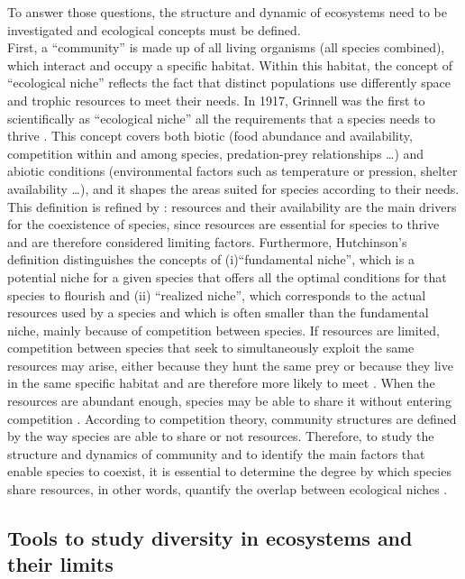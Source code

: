 To answer those questions, the structure and dynamic of ecosystems need to be investigated and ecological concepts must be defined. \\ First, a ``community'' is made up of all living organisms (all species combined), which interact and occupy a specific habitat. Within this habitat, the concept of ``ecological niche'' reflects the fact that distinct populations use differently space and trophic resources to meet their needs. In 1917, Grinnell was the first to scientifically as ``ecological niche'' all the requirements that a species needs to thrive \citep{grinnell1917}.
This concept covers both biotic (food abundance and availability, competition within and among species, predation-prey relationships \ldots{}) and abiotic conditions (environmental factors such as temperature or pression, shelter availability \ldots{}), and it shapes the areas suited for species according to their needs. This definition is refined by \citet{hutchinson1957}: resources and their availability are the main drivers for the coexistence of species, since resources are essential for species to thrive and are therefore considered limiting factors. Furthermore, Hutchinson’s definition distinguishes the concepts of (i)``fundamental niche'', which is a potential niche for a given species that offers all the optimal conditions for that species to flourish and (ii) ``realized niche'', which corresponds to the actual resources used by a species and which is often smaller than the fundamental niche, mainly because of competition between species. If resources are limited, competition between species that seek to simultaneously exploit the same resources may arise, either because they hunt the same prey or because they live in the same specific habitat and are therefore more likely to meet \citep{blondel1979}. When the resources are abundant enough, species may be able to share it without entering competition \citep{nagelkerke2018}. According to competition theory, community structures are defined by the way species are able to share or not resources. Therefore, to study the structure and dynamics of community and to identify the main factors that enable species to coexist, it is essential to determine the degree by which species share resources, in other words, quantify the overlap between ecological niches \citep{geange2011}. 


\subsection{Tools to study diversity in ecosystems and their limits}

